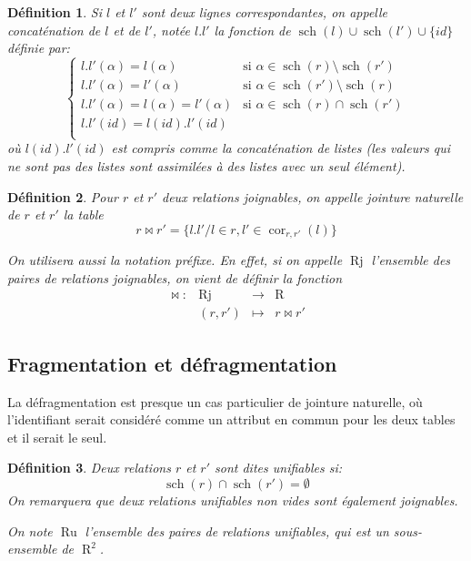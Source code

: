 \documentclass[french]{article}
\DeclareMathOperator{\R}{R}
\DeclareMathOperator{\s}{sch}
\DeclareMathOperator{\ru}{Ru}
\DeclareMathOperator{\cor}{cor}
\DeclareMathOperator{\rj}{Rj}
\newtheorem{defi}{Définition}
\begin{document}
\begin{defi}
	Si $l$ et $l'$ sont deux lignes correspondantes,
	on appelle \emph{concaténation de $l$ et de $l'$},
	notée $l.l'$ la fonction de $\s(l) \cup \s(l') \cup \{id\}$
	définie par:
	$$
	\left\lbrace
	\begin{array}{ll}
	l.l'(\alpha)  = l(\alpha) & \text{si $\alpha \in \s(r) \setminus \s(r')$} \\
	l.l'(\alpha)  = l'(\alpha) & \text{si $\alpha \in \s(r') \setminus \s(r)$} \\
	l.l'(\alpha)  = l(\alpha) = l'(\alpha) & \text{si $\alpha \in \s(r) \cap \s(r')$} \\
	l.l'(id)  = l(id).l'(id) &  \\
	\end{array}
	\right.
	$$
	où $l(id).l'(id)$ est compris comme la concaténation de listes
	(les valeurs qui ne sont pas des listes sont assimilées
	à des listes avec un seul élément).
\end{defi}

\begin{defi}
	Pour $r$ et $r'$ deux relations joignables,
	on appelle \emph{jointure naturelle}
	de $r$ et $r'$ la table
	$$
	r \Join r' = \{l.l' / l \in r, l' \in \cor_{r, r'}(l) \}
	$$
	
	On utilisera aussi la notation préfixe.
	En effet, si on appelle $\rj$ l'ensemble
	des paires de relations joignables,
	on vient de définir la fonction
	$$
	\begin{array}{llcl}
	\Join : & \rj & \rightarrow & \R \\
			& (r, r') & \mapsto & r \Join r'
	\end{array}
	$$
\end{defi}

\subsection*{Fragmentation et défragmentation}
La défragmentation est presque un cas particulier de jointure naturelle,
où l'identifiant serait considéré comme un attribut en commun pour les deux tables
et il serait le seul.

\begin{defi}
	Deux relations $r$ et $r'$ sont dites \emph{unifiables}
	si:
	$$
	\s(r) \cap \s(r') = \emptyset
	$$
	On remarquera que deux relations unifiables non vides sont également joignables.
	
	On note $\ru$ l'ensemble des paires de relations unifiables,
	qui	est un sous-ensemble de $\R^2$.
\end{defi}
\end{document}
